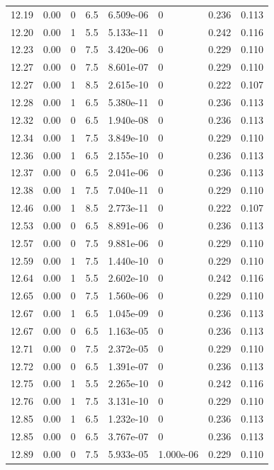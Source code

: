 \documentclass[preview]{standalone}
\begin{document}
{{{{{{{{{{\begin{tabular}{L{1.2cm}C{1.2cm} C{0.3cm}C{0.5cm} C{1.4cm}C{1.4cm} C{1.4cm}C{1.4cm}}
  12.19  &  0.00  & 0     & 6.5 &  6.509e-06  & 0  & 0.236 &  0.113   \\ 
  12.20  &  0.00  & 1     & 5.5 &  5.133e-11  & 0  & 0.242 &  0.116   \\ 
  12.23  &  0.00  & 0     & 7.5 &  3.420e-06  & 0  & 0.229 &  0.110   \\ 
  12.27  &  0.00  & 0     & 7.5 &  8.601e-07  & 0  & 0.229 &  0.110   \\ 
  12.27  &  0.00  & 1     & 8.5 &  2.615e-10  & 0  & 0.222 &  0.107   \\ 
  12.28  &  0.00  & 1     & 6.5 &  5.380e-11  & 0  & 0.236 &  0.113   \\ 
  12.32  &  0.00  & 0     & 6.5 &  1.940e-08  & 0  & 0.236 &  0.113   \\ 
  12.34  &  0.00  & 1     & 7.5 &  3.849e-10  & 0  & 0.229 &  0.110   \\ 
  12.36  &  0.00  & 1     & 6.5 &  2.155e-10  & 0  & 0.236 &  0.113   \\ 
  12.37  &  0.00  & 0     & 6.5 &  2.041e-06  & 0  & 0.236 &  0.113   \\ 
  12.38  &  0.00  & 1     & 7.5 &  7.040e-11  & 0  & 0.229 &  0.110   \\ 
  12.46  &  0.00  & 1     & 8.5 &  2.773e-11  & 0  & 0.222 &  0.107   \\ 
  12.53  &  0.00  & 0     & 6.5 &  8.891e-06  & 0  & 0.236 &  0.113   \\ 
  12.57  &  0.00  & 0     & 7.5 &  9.881e-06  & 0  & 0.229 &  0.110   \\ 
  12.59  &  0.00  & 1     & 7.5 &  1.440e-10  & 0  & 0.229 &  0.110   \\ 
  12.64  &  0.00  & 1     & 5.5 &  2.602e-10  & 0  & 0.242 &  0.116   \\ 
  12.65  &  0.00  & 0     & 7.5 &  1.560e-06  & 0  & 0.229 &  0.110   \\ 
  12.67  &  0.00  & 1     & 6.5 &  1.045e-09  & 0  & 0.236 &  0.113   \\ 
  12.67  &  0.00  & 0     & 6.5 &  1.163e-05  & 0  & 0.236 &  0.113   \\ 
  12.71  &  0.00  & 0     & 7.5 &  2.372e-05  & 0  & 0.229 &  0.110   \\ 
  12.72  &  0.00  & 0     & 6.5 &  1.391e-07  & 0  & 0.236 &  0.113   \\ 
  12.75  &  0.00  & 1     & 5.5 &  2.265e-10  & 0  & 0.242 &  0.116   \\ 
  12.76  &  0.00  & 1     & 7.5 &  3.131e-10  & 0  & 0.229 &  0.110   \\ 
  12.85  &  0.00  & 1     & 6.5 &  1.232e-10  & 0  & 0.236 &  0.113   \\ 
  12.85  &  0.00  & 0     & 6.5 &  3.767e-07  & 0  & 0.236 &  0.113   \\ 
  12.89  &  0.00  & 0     & 7.5 &  5.933e-05  & 1.000e-06  & 0.229 &  0.110   \\ 
\hline 
\end{tabular} 

}}}}}}}}}}
\end{document}
